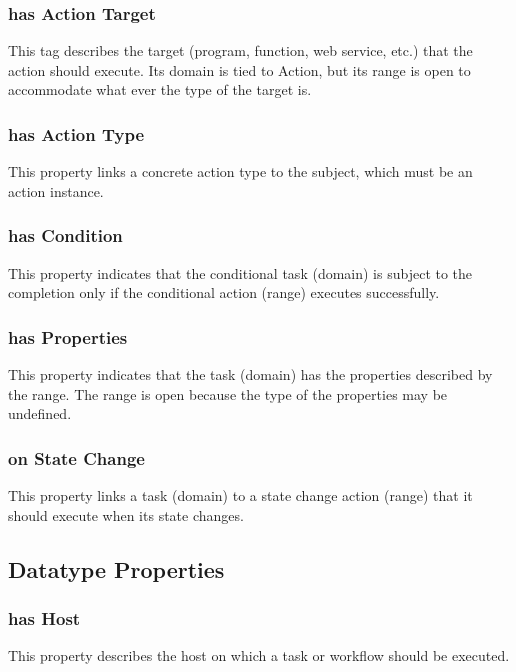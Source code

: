 			\subsubsection{
			has Action Target
			}
			This tag describes the target (program, function, web service, etc.) that the action should execute. Its domain is tied to Action, but its range is open to accommodate what ever the type of the target is.
			\subsubsection{
			has Action Type
			}
			This property links a concrete action type to the subject, which must be an action instance.
			\subsubsection{
			has Condition
			}
			This property indicates that the conditional task (domain) is subject to the completion only if the conditional action (range) executes successfully.
			\subsubsection{
			has Properties
			}
			This property indicates that the task (domain) has the properties described by the range. The range is open because the type of the properties may be undefined.
			\subsubsection{
			on State Change
			}
			This property links a task (domain) to a state change action (range) that it should execute when its state changes.
\subsection{Datatype Properties}
			\subsubsection{
			has Host
			}
			This property describes the host on which a task or workflow should be executed.
